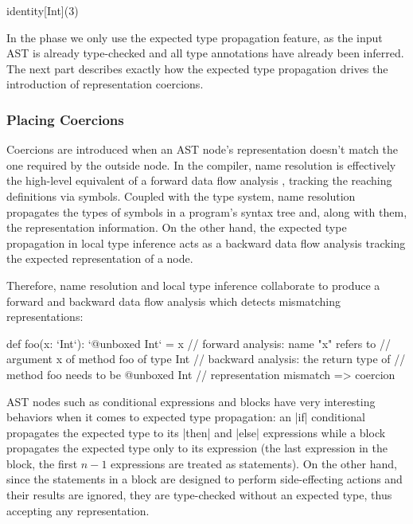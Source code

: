 \begin{lstlisting-nobreak}
 identity[Int](3)
\end{lstlisting-nobreak}

In the \coerce{} phase we only use the expected type propagation feature, as the input AST is already type-checked and all type annotations have already been inferred. The next part describes exactly how the expected type propagation drives the introduction of representation coercions.

\subsubsection*{Placing Coercions}
\label{ldl:subsec:coerce-key-insights}

Coercions are introduced when an AST node's representation doesn't match the one required by the outside node. In the compiler, name resolution is effectively the high-level equivalent of a forward data flow analysis \cite{escape-analysis-first-paper}, tracking the reaching definitions via symbols. Coupled with the type system, name resolution propagates the types of symbols in a program's syntax tree and, along with them, the representation information. On the other hand, the expected type propagation in local type inference acts as a backward data flow analysis tracking the expected representation of a node.

Therefore, name resolution and local type inference collaborate to produce a forward and backward data flow analysis which detects mismatching representations:

\begin{lstlisting-nobreak}
 def foo(x: `Int`):  `@unboxed Int` =
   x // forward analysis: name "x" refers to
      //     argument x of method foo of type Int
      // backward analysis: the return type of
      //     method foo needs to be @unboxed Int
      // representation mismatch => coercion
\end{lstlisting-nobreak}

AST nodes such as conditional expressions and blocks have very interesting behaviors when it comes to expected type propagation: an |if| conditional propagates the expected type to its |then| and |else| expressions while a block propagates the expected type only to its expression (the last expression in the block, the first $n-1$ expressions are treated as statements). On the other hand, since the statements in a block are designed to perform side-effecting actions and their results are ignored, they are type-checked without an expected type, thus accepting any representation.

